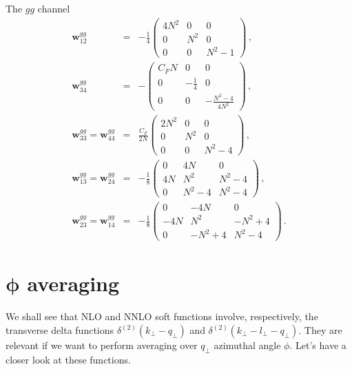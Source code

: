 \documentclass[a4paper,11pt]{report}
\numberwithin{equation}{section}
\newcommand{\bfw}{\bm{w}}
\begin{document}
The $gg$ channel
%
\begin{eqnarray}
 \bfw_{12}^{gg} & = &
 - \frac{1}{4}
 \left( \begin{array}{ccc}
   4N^2 & 0   & 0 \\
   0    & N^2 & 0 \\
   0    & 0   & N^2-1
 \end{array} \right)\,,
 \\[0.5em]
 \bfw_{34}^{gg} & = &
 - 
 \left( \begin{array}{ccc}
   C_F N & 0            & 0 \\
   0     & -\frac{1}{4} & 0 \\
   0     & 0            & -\frac{N^2-4}{4N^2}
 \end{array} \right)\,,
 \\[0.5em]
 \bfw_{33}^{gg}  = \bfw_{44}^{gg} & = &
 \frac{C_F}{2N}
 \left( \begin{array}{ccc}
   2N^2  & 0   & 0 \\
   0     & N^2 & 0 \\
   0     & 0   & N^2-4
 \end{array} \right)\,,
 \\[0.5em]
 \bfw_{13}^{gg}  = \bfw_{24}^{gg} & = &
 -\frac{1}{8}
 \left( \begin{array}{ccc}
   0  & 4N     & 0 \\
   4N & N^2    & N^2-4 \\
   0  & N^2-4  & N^2-4
 \end{array} \right)\,,
 \\[0.5em]
 \bfw_{23}^{gg}  = \bfw_{14}^{gg} & = &
 -\frac{1}{8}
 \left( \begin{array}{ccc}
   0   & -4N     & 0 \\
   -4N & N^2     & -N^2+4 \\
   0   & -N^2+4  & N^2-4
 \end{array} \right)\,.
\end{eqnarray}

\chapter[$\mathbold{\phi}$ averaging]{$\mathbold{\phi}$ averaging}

We shall see that NLO and NNLO soft functions involve, respectively, the
transverse delta functions $\delta^{(2)}(k_\perp-q_\perp)$ and
$\delta^{(2)}(k_\perp-l_\perp-q_\perp)$.
%
They are relevant if we want to perform averaging over $q_\perp$ azimuthal angle
$\phi$. Let's have a closer look at these functions.
\end{document}
